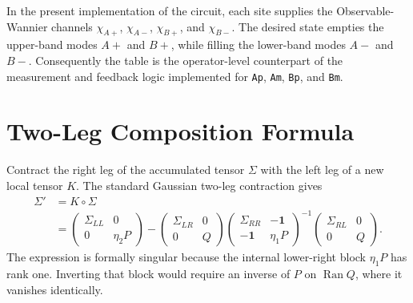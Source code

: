 \documentclass[aps,prb,onecolumn,nofootinbib,superscriptaddress]{revtex4-2}
\newcommand{\I}{\mathbf{1}}
\newcommand{\Ran}{\operatorname{Ran}}
\theoremstyle{plain}
\theoremstyle{definition}
\begin{document}
In the present implementation of the circuit, each site supplies the
Observable-Wannier channels \(\chi_{A+}\), \(\chi_{A-}\), \(\chi_{B+}\),
and \(\chi_{B-}\).  The desired state empties
the upper-band modes \(A+\) and \(B+\), while filling the lower-band modes
\(A-\) and \(B-\).  Consequently the table is the operator-level
counterpart of the measurement and feedback logic implemented for
\texttt{Ap}, \texttt{Am}, \texttt{Bp}, and \texttt{Bm}.

\section{Two-Leg Composition Formula}

Contract the right leg of the accumulated tensor \(\Sigma\) with the left
leg of a new local tensor \(K\).  The standard Gaussian two-leg contraction
gives
\begin{align}
  \Sigma'
  &=
  K\circ\Sigma
  \nonumber\\
  &=
  \begin{pmatrix}
    \Sigma_{LL} & 0\\
    0 & \eta_2P
  \end{pmatrix}
  -
  \begin{pmatrix}
    \Sigma_{LR} & 0\\
    0 & Q
  \end{pmatrix}
  \begin{pmatrix}
    \Sigma_{RR} & -\I\\
    -\I & \eta_1P
  \end{pmatrix}^{-1}
  \begin{pmatrix}
    \Sigma_{RL} & 0\\
    0 & Q
  \end{pmatrix}.
  \label{eq:singular-composition}
\end{align}
The expression is formally singular because the internal lower-right block
\(\eta_1P\) has rank one.  Inverting that block would require an inverse of
\(P\) on \(\Ran Q\), where it vanishes identically.
\end{document}
